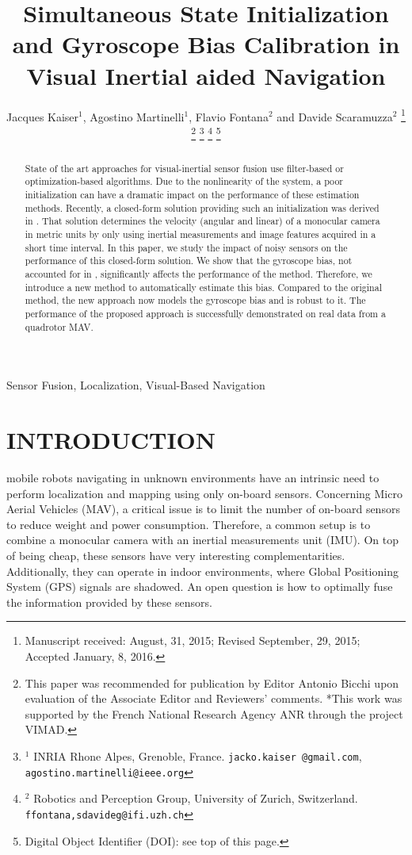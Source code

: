 \documentclass[letterpaper, 10 pt, journal, twoside]{IEEEtran}  %
\title{Simultaneous State Initialization and Gyroscope Bias Calibration in Visual Inertial aided Navigation} %
\author{Jacques Kaiser$^{1}$, Agostino Martinelli$^{1}$, Flavio Fontana$^{2}$ and Davide Scaramuzza$^{2}$%
\thanks{Manuscript received: August, 31, 2015; Revised September, 29, 2015; Accepted January, 8, 2016.}%
\thanks{This paper was recommended for publication by Editor Antonio Bicchi upon evaluation of the Associate Editor and Reviewers' comments. *This work was supported by the French National Research Agency ANR through the project VIMAD.}%
\thanks{$^{1}$ INRIA Rhone Alpes, Grenoble, France. {\tt\small jacko.kaiser @gmail.com}, {\tt\small agostino.martinelli@ieee.org}}%
\thanks{$^{2}$ Robotics and Perception Group, University of Zurich, Switzerland. {\tt\small ffontana,sdavideg@ifi.uzh.ch}}%
\thanks{Digital Object Identifier (DOI): see top of this page.}
}
\begin{document}
\maketitle




\begin{abstract}
State of the art approaches for visual-inertial sensor fusion use filter-based or optimization-based algorithms. Due to the nonlinearity of the system, a poor initialization can have a dramatic impact on the performance of these estimation methods.
Recently, a closed-form solution providing such an initialization was derived in \cite{Martinelli2014}.
That solution determines the velocity (angular and linear) of a monocular camera in metric units by only using inertial measurements and image features acquired in a short time interval.
In this paper, we study the impact of noisy sensors on the performance of this closed-form solution. We show that the gyroscope bias, not accounted for in \cite{Martinelli2014}, significantly affects the performance of the method.
Therefore, we introduce a new method to automatically estimate this bias.
Compared to the original method, the new approach now models the gyroscope bias and is robust to it.
The performance of the proposed approach is successfully demonstrated on real data from a quadrotor MAV.
\end{abstract}

\begin{IEEEkeywords}
  Sensor Fusion, Localization, Visual-Based Navigation
\end{IEEEkeywords}


\section{INTRODUCTION}

 mobile robots navigating in unknown environments have an intrinsic need to perform localization and mapping using only on-board sensors.
Concerning Micro Aerial Vehicles (MAV), a critical issue is to limit the number of on-board sensors to reduce weight and power consumption.
Therefore, a common setup is to combine a monocular camera with an inertial measurements unit (IMU).
On top of being cheap, these sensors have very interesting complementarities.
Additionally, they can operate in indoor environments, where Global Positioning System (GPS) signals are shadowed.
An open question is how to optimally fuse the information provided by these sensors.
\end{document}
